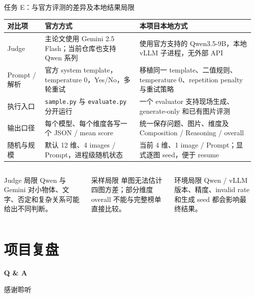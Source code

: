 \documentclass[aspectratio=169,10pt]{beamer}
\begin{document}
\begin{frame}{任务 E：与官方评测的差异及本地结果局限}
  \begin{table}
    \centering\scriptsize
    \renewcommand{\arraystretch}{1.28}
    \begin{tabularx}{\textwidth}{p{2.0cm}X X}
      \toprule
      对比项 & 官方方式 & 本项目本地方式 \\
      \midrule
      Judge & 主论文使用 Gemini 2.5 Flash；当前仓库也支持 Qwen 系列 & 使用官方支持的 Qwen3.5-9B，本地 vLLM 子进程，无外部 API \\
      Prompt / 解析 & 官方 system template，temperature 0，Yes/No，多轮重试 & 移植同一 template、二值规则、temperature 0、repetition penalty 与重试策略 \\
      执行入口 & \texttt{sample.py} 与 \texttt{evaluate.py} 分开运行 & 一个 evaluator 支持现场生成、generate-only 和已有图片评测 \\
      输出口径 & 每个模型、每个维度各写一个 JSON / mean score & 统一保存问题、图片、维度及 Composition / Reasoning / overall \\
      随机与规模 & 默认 12 维、4 images / Prompt，进程级随机状态 & 当前 4 维、1 image / Prompt；显式逐图 seed，便于 resume \\
      \bottomrule
    \end{tabularx}
  \end{table}

  \vspace{0.45em}
  \begin{columns}[T,onlytextwidth]
      \begin{block}{Judge 局限}
        \centering\scriptsize
        Qwen 与 Gemini 对小物体、文字、否定和复杂关系可能给出不同判断。
      \end{block}
      \begin{block}{采样局限}
        \centering\scriptsize
        单图无法估计四图方差；部分维度 overall 不能与完整榜单直接比较。
      \end{block}
      \begin{block}{环境局限}
        \centering\scriptsize
        Qwen / vLLM 版本、精度、invalid rate 和生成 seed 都会影响最终结果。
      \end{block}
  \end{columns}
\end{frame}

\section{项目复盘}
\begin{frame}[plain]
  \begin{center}
    \vspace{1.0cm}
    {\Huge\color{T2INavy}\bfseries Q \& A}

    \vspace{1.2cm}
    {\Large 感谢聆听}
  \end{center}
\end{frame}
\end{document}
